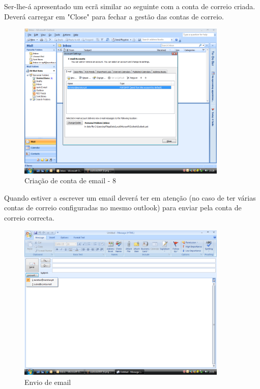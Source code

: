 Ser-lhe-á apresentado um ecrã similar ao seguinte com a conta de correio criada. Deverá carregar em "Close" para fechar a gestão das contas de correio.

\begin{figure}[H]
    \begin{center}
        \includegraphics[width=10cm]{include/img/outlook2007_9}
    \end{center}
    \caption{Criação de conta de email - 8}
    \label{fig:OUTLK2k79}
\end{figure}

Quando estiver a escrever um email deverá ter em atenção (no caso de ter várias contas de correio configuradas no mesmo outlook) para enviar pela conta de correio correcta.

\begin{figure}[H]
    \begin{center}
        \includegraphics[width=10cm]{include/img/outlook2007_10}
    \end{center}
    \caption{Envio de email}
    \label{fig:OUTLK2k710}
\end{figure}

